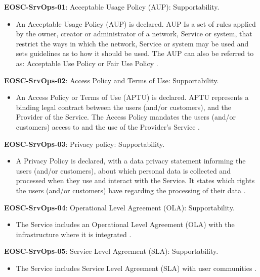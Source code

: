\textbf{EOSC-SrvOps-01}: Acceptable Usage Policy (AUP): Supportability.

\begin{itemize}
    \item An Acceptable Usage Policy (AUP) is declared. AUP Is a set of rules applied by the owner, creator or administrator of a network, Service or system, that restrict the ways in which the network, Service or system may be used and sets guidelines as to how it should be used. The AUP can also be referred to as: Acceptable Use Policy or Fair Use Policy \cite{orviz_fernandez_eosc-synergy_2020}.
\end{itemize}

\textbf{EOSC-SrvOps-02}: Access Policy and Terms of Use: Supportability.

\begin{itemize}
    \item An Access Policy or Terms of Use (APTU) is declared. APTU represents a binding legal contract between the users (and/or customers), and the Provider of the Service. The Access Policy mandates the users (and/or customers) access to and the use of the Provider's Service \cite{orviz_fernandez_eosc-synergy_2020}.
\end{itemize}

\textbf{EOSC-SrvOps-03}: Privacy policy: Supportability.

\begin{itemize}
    \item A Privacy Policy is declared, with a data privacy statement informing the users (and/or customers), about which personal data is collected and processed when they use and interact with the Service. It states which rights the users (and/or customers) have regarding the processing of their data \cite{orviz_fernandez_eosc-synergy_2020}.
\end{itemize}

\textbf{EOSC-SrvOps-04}: Operational Level Agreement (OLA): Supportability.

\begin{itemize}
    \item The Service includes an Operational Level Agreement (OLA) with the infrastructure where it is integrated \cite{orviz_fernandez_eosc-synergy_2020}.
\end{itemize}

\textbf{EOSC-SrvOps-05}: Service Level Agreement (SLA): Supportability.

\begin{itemize}
    \item The Service includes Service Level Agreement (SLA) with user communities \cite{orviz_fernandez_eosc-synergy_2020}.
\end{itemize}

